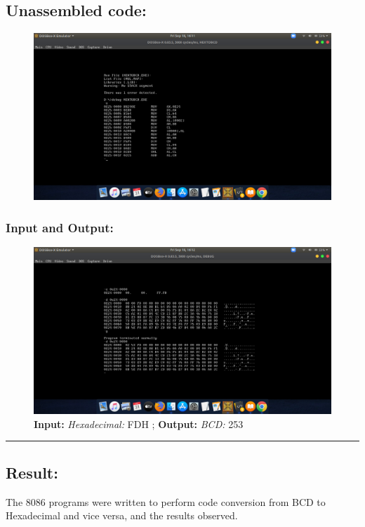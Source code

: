 \documentclass[12pt,a4paper]{article}
\begin{document}
\begin{flushleft}
\subsection*{\textbf{Unassembled code:}}
\begin{figure}[h]
    \centering
    \includegraphics[trim = 100mm 60mm 200mm 110mm, clip, width = \textwidth]{Pics/HBUS.png}
\end{figure}
\subsubsection*{\textbf{Input and Output:}}
\begin{figure}[h]
    \centering
    \includegraphics[trim = 100mm 60mm 100mm 80mm, clip, width = \textwidth]{Pics/HBIO.png}
    \caption{ \textbf{Input:} \emph{Hexadecimal:} FDH ; \newline \hspace{1cm}
              \textbf{Output:} \emph{BCD:} 253}
\end{figure}
\hrule
\subsection*{\textbf{Result:}}
The 8086 programs were written to perform code conversion from BCD to Hexadecimal and vice versa, and the results observed.
\end{flushleft}
\end{document}
